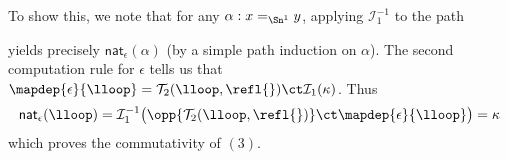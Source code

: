 \documentclass[
%
%
11pt %
]{article}
\newcommand{\nathom}[2]{\mathsf{nat}_{#1}(#2)}
\newcommand{\T}[2]{\mathcal{T}_2(#1,#2)}
\newcommand{\I}{\mathcal{I}_1}
\begin{document}
To show this, we note that for any $\alpha : x =_{\Sn^1} y$, applying $\I^{-1}$ to the path
\begin{center}
\end{center}
yields precisely $\nathom{\epsilon}{\alpha}$ (by a simple path induction on $\alpha$). The second computation rule for $\epsilon$ tells us that $\mapdep{\epsilon}{\lloop} = \T{\lloop}{\refl{}} \ct \I(\kappa)$. Thus
\[\nathom{\epsilon}{\lloop} = \I^{-1}\big(\opp{\T{\lloop}{\refl{}}} \ct \mapdep{\epsilon}{\lloop}\big) = \kappa \]
which proves the commutativity of $(3)$.
\end{document}

